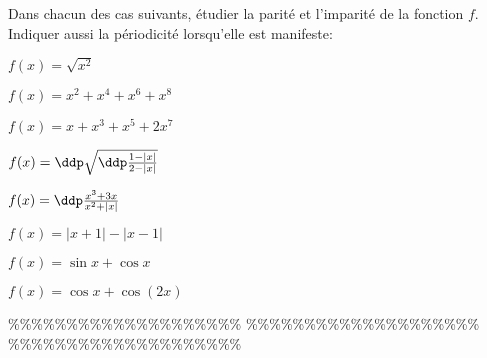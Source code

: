 



\begin{exercice}  \;
Dans chacun des cas suivants, \'etudier la parit\'e et l'imparit\'e de la fonction $f$. Indiquer aussi la p\'eriodicit\'e lorsqu'elle est manifeste:
\begin{enumerate}
\begin{minipage}[t]{0.4\textwidth}
 \item $f(x)=\sqrt{x^2}$ 
\item $f(x)=x^2+x^4+x^6+x^8$ 
\item $f(x)=x+x^3+x^5+2x^7$ 
\item $f(x)=\ddp\sqrt{\ddp\frac{1-|x|}{2-|x|}}$ 
\end{minipage}
\begin{minipage}[t]{0.4\textwidth}
\item $f(x)=\ddp\frac{x^3+3x}{x^2+|x|}$ 
\item $f(x)=|x+1|-|x-1|$ 
\item $f(x)=\sin{x}+\cos{x}$ 
\item $f(x)=\cos{x}+\cos{(2x)}$ 
\end{minipage}
\end{enumerate}
\end{exercice}


\%\%\%\%\%\%\%\%\%\%\%\%\%\%\%\%\%\%\%\%
\%\%\%\%\%\%\%\%\%\%\%\%\%\%\%\%\%\%\%\%
\%\%\%\%\%\%\%\%\%\%\%\%\%\%\%\%\%\%\%\%



